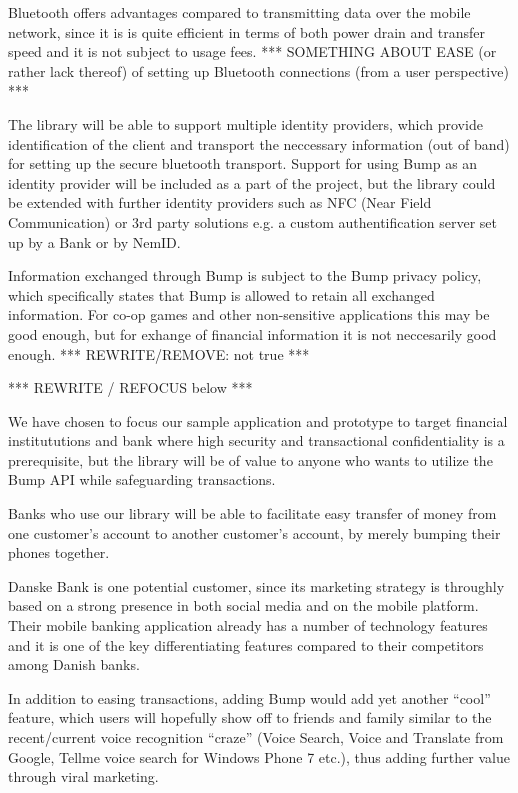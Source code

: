 \documentclass[a4paper,11pt]{article}
\begin{document}
Bluetooth offers advantages compared to transmitting data over the mobile network, since it is is quite efficient in terms of both power drain and transfer speed and it is not subject to usage fees.
*** SOMETHING ABOUT EASE (or rather lack thereof) of setting up Bluetooth connections (from a user perspective) ***

The library will be able to support multiple identity providers, which provide identification of the client and transport the neccessary information (out of band) for setting up the secure bluetooth transport. Support for using Bump as an identity provider will be included as a part of the project, but the library could be extended with further identity providers such as NFC (Near Field Communication) or 3rd party solutions e.g. a custom authentification server set up by a Bank or by NemID.

Information exchanged through Bump is subject to the Bump privacy policy, which specifically states that Bump is allowed to retain all exchanged information. For co-op games and other non-sensitive applications this may be good enough, but for exhange of financial information it is not neccesarily good enough. *** REWRITE/REMOVE: not true ***

*** REWRITE / REFOCUS below ***

We have chosen to focus our sample application and prototype to target financial institututions and bank where high security and transactional confidentiality is a prerequisite, but the library will be of value to anyone who wants to utilize the Bump API while safeguarding transactions.

Banks who use our library will be able to facilitate easy transfer of money from one customer's account to another customer's account, by merely bumping their phones together.

Danske Bank is one potential customer, since its marketing strategy is throughly based on a strong presence in both social media and on the mobile platform. Their mobile banking application already has a number of technology features and it is one of the key differentiating features compared to their competitors among Danish banks.

In addition to easing transactions, adding Bump would add yet another ``cool'' feature, which users will hopefully show off to friends and family similar to the recent/current voice recognition ``craze'' (Voice Search, Voice and Translate from Google, Tellme voice search for Windows Phone 7 etc.), thus adding further value through viral marketing.
\end{document}
